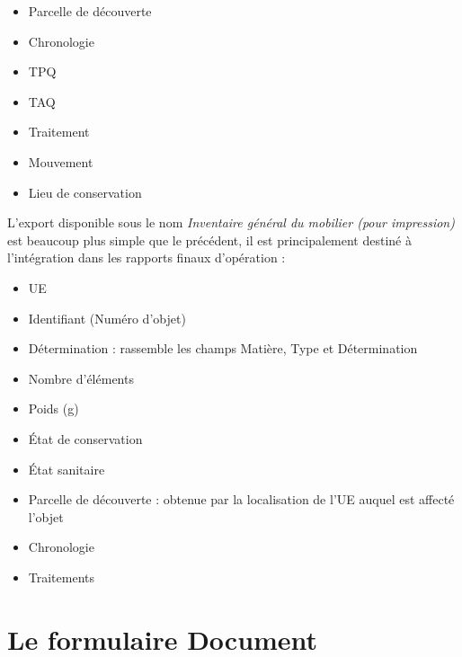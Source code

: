 \documentclass[letterpaper,10pt,french]{sphinxmanual}
\begin{document}
\begin{itemize}
\item {} 
Parcelle de découverte

\item {} 
Chronologie

\item {} 
TPQ

\item {} 
TAQ

\item {} 
Traitement

\item {} 
Mouvement

\item {} 
Lieu de conservation

\end{itemize}

L'export disponible sous le nom \emph{Inventaire général du mobilier (pour impression)} est beaucoup plus simple que le précédent, il est principalement destiné à l'intégration dans les rapports finaux d'opération :
\begin{itemize}
\item {} 
UE

\item {} 
Identifiant (Numéro d'objet)

\item {} 
Détermination : rassemble les champs Matière, Type et Détermination

\item {} 
Nombre d'éléments

\item {} 
Poids (g)

\item {} 
État de conservation

\item {} 
État sanitaire

\item {} 
Parcelle de découverte : obtenue par la localisation de l'UE auquel est affecté l'objet

\item {} 
Chronologie

\item {} 
Traitements

\end{itemize}


\chapter{Le formulaire Document}
\label{manuel/formulaire_documentation::doc}\label{manuel/formulaire_documentation:le-formulaire-document}
\end{document}

